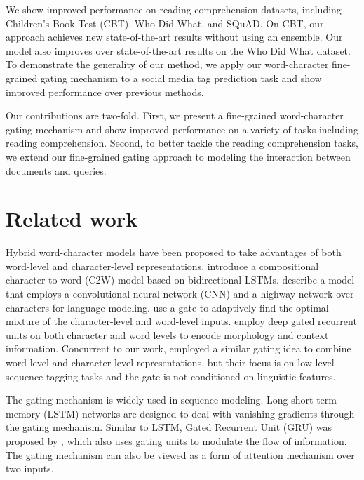 \documentclass{article} \usepackage{iclr2017_conference,times}
\begin{document}
We show improved performance on reading comprehension datasets, including Children's Book Test (CBT), Who Did What, and SQuAD. On CBT, our approach achieves new state-of-the-art results without using an ensemble. Our model also improves over state-of-the-art results on the Who Did What dataset. To demonstrate the generality of our method, we apply our word-character fine-grained gating mechanism to a social media tag prediction task and show improved performance over previous methods.

Our contributions are two-fold. First, we present a fine-grained word-character gating mechanism and show improved performance on a variety of tasks including reading comprehension. Second, to better tackle the reading comprehension tasks, we extend our fine-grained gating approach to modeling the interaction between documents and queries. 


 
\section{Related work}
\vspace{-0.05in}
Hybrid word-character models have been proposed to take advantages of both word-level and character-level representations. \cite{ling2015finding} introduce a compositional character to word (C2W) model based on bidirectional LSTMs. \cite{kim2015character} describe a model that employs a convolutional neural network (CNN) and a highway network over characters for language modeling.
\cite{miyamoto2016gated} use a gate to adaptively find the optimal mixture of the character-level and word-level inputs. \cite{yang2016multi} employ deep gated recurrent units on both character and word levels to encode morphology and context information. Concurrent to our work, \cite{rei2016attending} employed a similar gating idea to combine word-level and character-level representations, but their focus is on low-level sequence tagging tasks and the gate is not conditioned on linguistic features.

The gating mechanism is widely used in sequence modeling. Long short-term memory (LSTM) networks \citep{hochreiter1997long} are designed to deal with vanishing gradients through the gating mechanism. Similar to LSTM, Gated Recurrent Unit (GRU) was proposed by \cite{cho2014properties}, which also uses gating units to modulate the flow of information. The gating mechanism can also be viewed as a form of attention mechanism \citep{bahdanau2014neural,yang2016encode} over two inputs.
\end{document}
